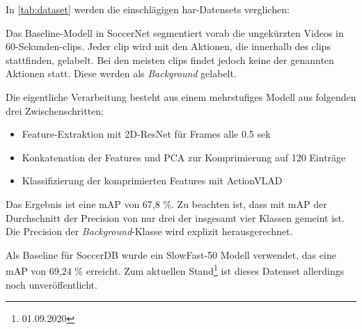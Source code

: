 In \autoref{tab:dataset} werden die einschlägigen \gls{har}-Datensets verglichen:

Das Baseline-Modell in SoccerNet segmentiert vorab die ungekürzten Videos in 60-Sekunden-\glspl{clip}.
Jeder \gls{clip} wird mit den Aktionen, die innerhalb des \glspl{clip} stattfinden, gelabelt.
Bei den meisten \glspl{clip} findet jedoch keine der genannten Aktionen statt.
Diese werden als \emph{Background} gelabelt.

Die eigentliche Verarbeitung besteht aus einem mehrstufiges Modell aus folgenden drei Zwischenschritten:

\begin{itemize}
    \item Feature-Extraktion mit 2D-ResNet für Frames alle 0.5 sek
    \item Konkatenation der Features und PCA zur Komprimierung auf 120 Einträge
    \item Klassifizierung der komprimierten Features mit ActionVLAD
\end{itemize}

Das Ergebnis ist eine mAP von 67,8 \%.
Zu beachten ist, dass mit mAP der Durchschnitt der Precision von nur drei der insgesamt vier Klassen gemeint ist.
Die Precision der \emph{Background}-Klasse wird explizit herausgerechnet.

Als Baseline für SoccerDB wurde ein SlowFast-50 Modell verwendet, das eine mAP von 69,24 \% erreicht.
Zum aktuellen Stand\footnote{01.09.2020} ist dieses Datenset allerdings noch unveröffentlicht.

